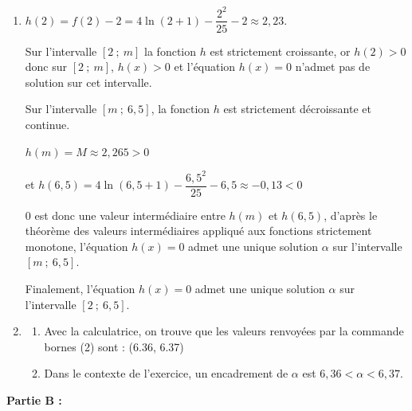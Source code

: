 \documentclass[10pt]{article}
\begin{document}
\begin{enumerate}
$[2~;~6,5] \subset ]-1~;~x_1[$ donc $f$ est strictement croissante sur $[2~;~6,5]$.

\item $h(2) =f(2) - 2 = 4 \ln (2+1)-\dfrac{2^{2}}{25}-2 \approx 2,23$.

Sur l'intervalle $[2~;~m]$ la fonction $h$ est strictement croissante, or $h(2)>0$ donc sur $[2~;~m]$, $h(x)>0$ et l'équation $h(x)=0$ n'admet pas de solution sur cet intervalle.

Sur l'intervalle $[m~;~6,5]$, la fonction $h$ est strictement décroissante et continue.

$h(m) = M \approx 2,265 > 0$

et $h(6,5)=4 \ln (6,5+1)-\dfrac{6,5^{2}}{25} -6,5 \approx -0,13 <0$

0 est donc une valeur intermédiaire entre $h(m)$ et $h(6,5)$, 
d'après le théorème des valeurs intermédiaires appliqué aux fonctions strictement monotone, l'équation $h(x)=0$ admet une unique solution $\alpha$  sur l'intervalle $[m~;~6,5]$.

Finalement, l'équation $h(x)=0$ admet une unique solution $\alpha$ sur l'intervalle $[2~;~6,5]$.
\item
	\begin{enumerate}
		\item Avec la calculatrice, on trouve que les valeurs renvoyées par la commande bornes (2) sont : (6.36, 6.37)
		\item Dans le contexte de l'exercice, un encadrement de $\alpha$ est $6,36 < \alpha < 6,37$.
	\end{enumerate}
\end{enumerate}

\medskip

\textbf{Partie B :}

\medskip
\end{document}
